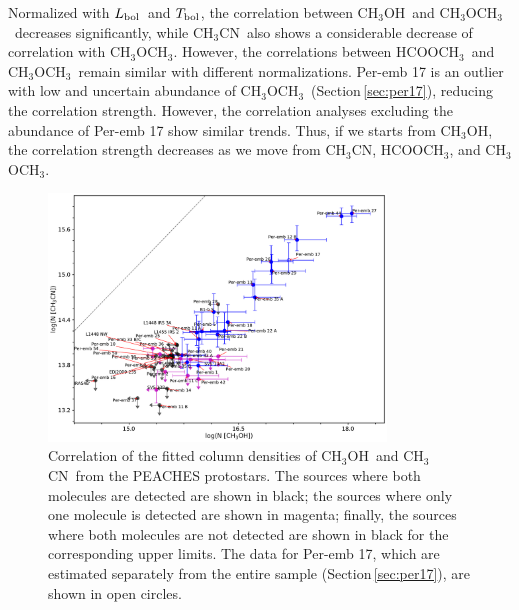 \documentclass[twocolumn]{aastex62}
\newcommand{\lbol}{\mbox{$L_{\rm bol}$}}
\newcommand{\tbol}{\mbox{$T_{\rm bol}$}}
\newcommand{\methylformate}{\mbox{HCOOCH$_{3}$}}
\newcommand{\methanol}{\mbox{CH$_{3}$OH}}
\newcommand{\dimethylether}{\mbox{CH$_{3}$OCH$_{3}$}}
\newcommand{\methylcyanide}{\mbox{CH$_{3}$CN}}
\newcommand{\cch}{\mbox{C$_2$H}}
\begin{document}
Normalized with \lbol\ and \tbol, the correlation between \methanol\ and \dimethylether\ decreases significantly, while \methylcyanide\ also shows a considerable decrease of correlation with \dimethylether.  However, the correlations between \methylformate\ and \dimethylether\ remain similar with different normalizations.  Per-emb 17 is an outlier with low and uncertain abundance of \dimethylether\ (Section\,\ref{sec:per17}), reducing the correlation strength.  However, the correlation analyses excluding the abundance of Per-emb 17 show similar trends.  Thus, if we starts from \methanol, the correlation strength decreases as we move from \methylcyanide, \methylformate, and \dimethylether.


\begin{figure}[htbp!]
  \centering
  \includegraphics[width=0.8\textwidth]{Ncol_ch3oh_ch3cn.pdf}
  \caption{Correlation of the fitted column densities of \methanol\ and \methylcyanide\ from the PEACHES protostars.  The sources where both molecules are detected are shown in black; the sources where only one molecule is detected are shown in magenta; finally, the sources where both molecules are not detected are shown in black for the corresponding upper limits.  The data for Per-emb 17, which are estimated separately from the entire sample (Section\,\ref{sec:per17}), are shown in open circles.}
  \label{fig:ch3oh_ch3cn}
\end{figure}
\end{document}
